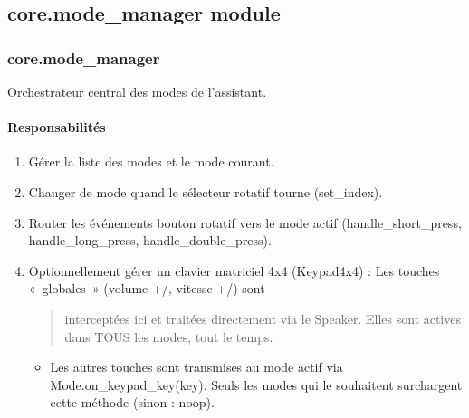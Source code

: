 \documentclass[letterpaper,10pt,french]{sphinxmanual}
\begin{document}
\subsection{core.mode\_manager module}
\label{\detokenize{api/core:module-core.mode_manager}}\label{\detokenize{api/core:core-mode-manager-module}}

\subsubsection{core.mode\_manager}
\label{\detokenize{api/core:core-mode-manager}}
\sphinxAtStartPar
Orchestrateur central des modes de l’assistant.


\paragraph{Responsabilités}
\label{\detokenize{api/core:responsabilites}}\begin{enumerate}
%
\item {} 
\sphinxAtStartPar
Gérer la liste des modes et le mode courant.

\item {} 
\sphinxAtStartPar
Changer de mode quand le sélecteur rotatif tourne (set\_index).

\item {} 
\sphinxAtStartPar
Router les événements bouton rotatif vers le mode actif
(handle\_short\_press, handle\_long\_press, handle\_double\_press).

\item {} 
\sphinxAtStartPar
Optionnellement gérer un clavier matriciel 4x4 (Keypad4x4) :
\sphinxhyphen{} Les touches « globales » (volume +/\sphinxhyphen{}, vitesse +/\sphinxhyphen{}) sont
\begin{quote}

\sphinxAtStartPar
interceptées ici et traitées directement via le Speaker.
Elles sont actives dans TOUS les modes, tout le temps.
\end{quote}
\begin{itemize}
\item {} 
\sphinxAtStartPar
Les autres touches sont transmises au mode actif via
Mode.on\_keypad\_key(key). Seuls les modes qui le souhaitent
surchargent cette méthode (sinon : no\sphinxhyphen{}op).

\end{itemize}

\end{enumerate}
\end{document}
